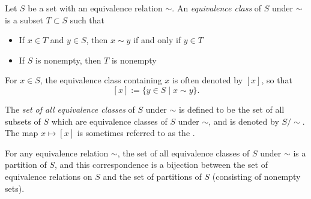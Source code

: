 \documentclass{article}
\begin{document}
Let $S$ be a set with an equivalence relation $\sim$. An {\em equivalence class} of $S$ under $\sim$ is a subset $T\subset S$ such that
\begin{itemize}
\item If $x \in T$ and $y \in S$, then $x \sim y$ if and only if $y \in T$
\item If $S$ is nonempty, then $T$ is nonempty
\end{itemize}

For $x \in S$, the equivalence class containing $x$ is often denoted by $[x]$, so that
$$
[x] := \{ y \in S \mid x \sim y \}.
$$

The {\em set of all equivalence classes} of $S$ under $\sim$ is defined to be the set of all subsets of $S$ which are equivalence classes of $S$ under $\sim$, and is denoted by $S/\sim$.  The map $x\mapsto [x]$ is sometimes referred to as the .

For any equivalence relation $\sim$, the set of all equivalence classes of $S$ under $\sim$ is a partition of $S$, and this correspondence is a bijection between the set of equivalence relations on $S$ and the set of partitions of $S$ (consisting of nonempty sets).
\end{document}

